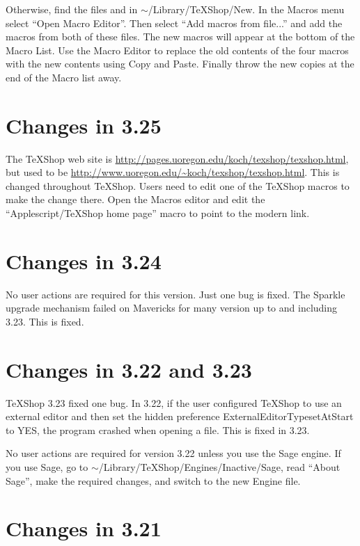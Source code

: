\documentclass[11pt, oneside]{amsart}
\begin{document}
Otherwise, find the files  and 
in $\sim$/Library/TeXShop/New. In the Macros menu select ``Open Macro Editor''. Then
select ``Add macros from file...'' and add the macros from both of these files. The
new macros will appear at the bottom of the Macro List. Use the Macro Editor to
replace the old contents of the four macros with the new contents using Copy and Paste.
Finally throw the new copies at the end of the Macro list away.

 
\section{Changes in 3.25} 

The TeXShop web site is \url{http://pages.uoregon.edu/koch/texshop/texshop.html}, but used to be \url{http://www.uoregon.edu/~koch/texshop/texshop.html}. This is changed throughout TeXShop. Users need to edit one of the TeXShop macros to make the change there. Open the Macros editor and edit the 
``Applescript/TeXShop home page'' macro to point to the modern link.
 
\section{Changes in 3.24}

No user actions are required for this version. Just one bug is fixed. The Sparkle
upgrade mechanism failed on Mavericks for many version up to and including 3.23. This
is fixed.

\section{Changes in 3.22 and 3.23}

TeXShop 3.23 fixed one bug. In 3.22, if the user configured TeXShop to use an external editor
and then set the hidden preference ExternalEditorTypesetAtStart to YES,  the program crashed when opening a file. This is fixed in 3.23.

No user actions are required for version 3.22 unless you use the Sage engine. If you use Sage, go to $\sim$/Library/TeXShop/Engines/Inactive/Sage, read ``About Sage'', make the required changes, and switch to the new Engine file.

\section{Changes in 3.21}
\end{document}
